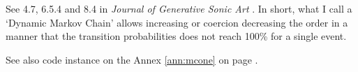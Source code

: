 \bigskip
\color{white}{-}
\color{black}
\bigskip


\bigskip

See  4.7, 6.5.4 and 8.4 in \textsl{Journal of Generative Sonic Art} \citep{yi}. In short, what I call a `Dynamic Markov Chain' allows increasing or coercion decreasing the order in a manner that the transition probabilities does not reach 100\% for a single event.
 
See also code instance on the Annex \ref{ann:mcone} on page \pageref{ann:mcone}.


